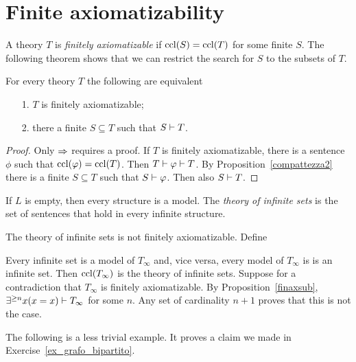 \documentclass[creche.tex]{subfiles}
\begin{document}
\section{Finite axiomatizability}

A theory $T$ is \emph{finitely axiomatizable\/} if ${\rm ccl}(S)={\rm ccl}(T)$ for some finite $S$. The following theorem shows that we can restrict the search for $S$ to the subsets of $T$.

\begin{proposition}\label{finaxsub} For every theory $T$ the following are equivalent
\begin{itemize}
\item[1.] $T$ is finitely axiomatizable;
\item[2.] there a finite $S\subseteq T$ such that $S\vdash T$.
\end{itemize}
\end{proposition}

\begin{proof}
Only $\Rightarrow$ requires a proof. If $T$ is finitely axiomatizable, there is a sentence $\phi$ such that ${\rm ccl}(\varphi)={\rm ccl}(T)$. Then $T\vdash\varphi\vdash T$. By Proposition~\ref{compattezza2} there is a finite $S\subseteq T$ such that $S\vdash\varphi$. Then also $S\vdash T$.
\end{proof}

If $L$ is empty, then every structure is a model. The \emph{theory of infinite sets\/} is the set of sentences that hold in every infinite structure.

\begin{example} 
The theory of infinite sets is not finitely axiomatizable. Define


Every infinite set is a model of $T_{\infty}$ and, vice versa, every model of $T_{\infty}$ is is an infinite set. Then ${\rm ccl}(T_{\infty})$ is the theory of infinite sets. Suppose for a contradiction that $T_{\infty}$ is finitely axiomatizable. By Proposition~\ref{finaxsub}, $\exists^{\ge n}x (x=x)\vdash T_{\infty}$ for some $n$. Any set of cardinality $n+1$ proves that this is not the case.\QED
\end{example}

The following is a less trivial example. It proves a claim we made in Exercise~\ref{ex_grafo_bipartito}.
\end{document}
